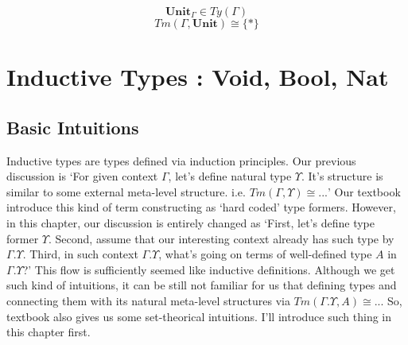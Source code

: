 \documentclass[12pt, a4paper, openany, twoside]{book}
\theoremstyle{definition}
\theoremstyle{remark}
\theoremstyle{plain}
\numberwithin{equation}{section}
\begin{document}
\begin{tcolorbox}[colback=yellow!10!white,colframe=green!75!black,title=Construction 2.5.1.]\hypertarget{const 2.5.1.}{}
\[\mathbf{Unit}_\Gamma \in Ty(\Gamma)\]
\[Tm(\Gamma, \mathbf{Unit}) \cong \{*\}\]
\end{tcolorbox}

\begin{tcolorbox}[colback=yellow!10!white,colframe=green!75!black,title=Construction 2.5.2.]\hypertarget{const 2.5.2.}{}
\end{tcolorbox}
\newpage 
\chapter{Inductive Types : Void, Bool, Nat}

\section{Basic Intuitions}

Inductive types are types defined via induction principles. Our previous discussion is \lq For given context $\Gamma$, let's define natural type $\Upsilon$. 
It's structure is similar to some external meta-level structure. i.e. $Tm(\Gamma, \Upsilon) \cong ...$' 
Our textbook introduce this kind of term constructing as \lq hard coded' type formers. 
However, in this chapter, our discussion is entirely changed as \lq First, let's define type former $\Upsilon$. 
Second, assume that our interesting context already has such type by $\Gamma.\Upsilon$. 
Third, in such context $\Gamma.\Upsilon$, what's going on terms of well-defined type $A$ in $\Gamma.\Upsilon$?' 
This flow is sufficiently seemed like inductive definitions. Although we get such kind of intuitions, 
it can be still not familiar for us that defining types and connecting them with its natural meta-level structures via $Tm(\Gamma.\Upsilon, A) \cong ...$
So, textbook also gives us some set-theorical intuitions. I'll introduce such thing in this chapter first. 
\end{document}
